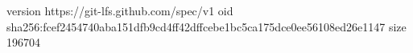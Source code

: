 version https://git-lfs.github.com/spec/v1
oid sha256:fcef2454740aba151dfb9cd4ff42dffcebe1bc5ca175dce0ee56108ed26e1147
size 196704
